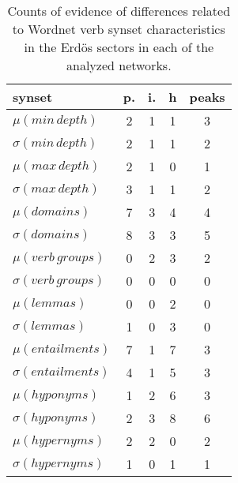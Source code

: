 \begin{table}[h!]
\begin{center}
\begin{tabular}{| l | c | c | c | c |}\hline
synset & p. & i. & h & peaks \\\hline
$\mu(min\,depth)$ & 2  & 1  & 1  & 3 \\\hline
$\sigma(min\,depth)$ & 2  & 1  & 1  & 2 \\\hline
$\mu(max\,depth)$ & 2  & 1  & 0  & 1 \\\hline
$\sigma(max\,depth)$ & 3  & 1  & 1  & 2 \\\hline
$\mu(domains)$ & 7  & 3  & 4  & 4 \\\hline
$\sigma(domains)$ & 8  & 3  & 3  & 5 \\\hline
$\mu(verb\,groups)$ & 0  & 2  & 3  & 2 \\\hline
$\sigma(verb\,groups)$ & 0  & 0  & 0  & 0 \\\hline
$\mu(lemmas)$ & 0  & 0  & 2  & 0 \\\hline
$\sigma(lemmas)$ & 1  & 0  & 3  & 0 \\\hline
$\mu(entailments)$ & 7  & 1  & 7  & 3 \\\hline
$\sigma(entailments)$ & 4  & 1  & 5  & 3 \\\hline
$\mu(hyponyms)$ & 1  & 2  & 6  & 3 \\\hline
$\sigma(hyponyms)$ & 2  & 3  & 8  & 6 \\\hline
$\mu(hypernyms)$ & 2  & 2  & 0  & 2 \\\hline
$\sigma(hypernyms)$ & 1  & 0  & 1  & 1 \\\hline
\end{tabular}
\caption{Counts of evidence of differences related to Wordnet verb synset characteristics in the Erd\"os sectors in each of the analyzed networks.}
\end{center}
\end{table}